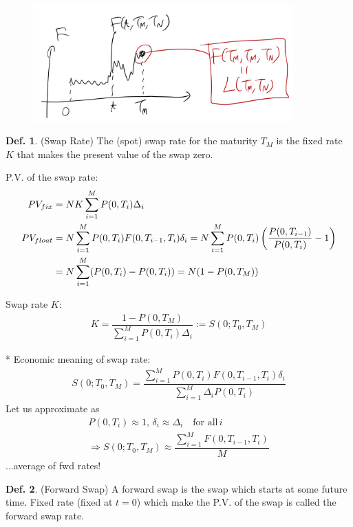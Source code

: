 \documentclass[a4paper,11pt]{jsarticle}
\theoremstyle{definition}
\newtheorem{definition}{Def.}[subsection]
\newcommand{\df}[2]{\dfrac{#1}{#2}}
\begin{document}
\begin{figure}[H]　%
  \begin{center}
    \includegraphics[width=10cm]{fig/1_3_02.JPG}
  \end{center}
\end{figure}


\begin{definition}{(Swap Rate)}
  The (spot) swap rate for the maturity $T_M$ is the fixed rate $K$
  that makes the present value of the swap zero.
\end{definition}

P.V. of the swap rate:
\begin{align}
  PV_{fix}&=NK\sum_{i=1}^M P(0,T_i)\Delta_i \\
  PV_{float}&=N\sum_{i=1}^M P(0,T_i)F(0,T_{i-1},T_i)\delta_i
  =N\sum_{i=1}^M P(0,T_i)
  \left(\df{P(0,T_{i-1})}{P(0,T_i)}-1\right) \notag \\
  &=N\sum_{i=1}^M (P(0,T_i)-P(0,T_i))
  =N(1-P(0,T_M))
\end{align}

Swap rate $K$:
\begin{align}
  K=\df{1-P(0,T_M)}{\sum_{i=1}^M P(0,T_i)\Delta_i}
  :=S(0;T_0,T_M)
\end{align}

* Economic meaning of swap rate:
\begin{align}
  S(0;T_0,T_M)
  =\df{\sum_{i=1}^M P(0,T_i)F(0,T_{i-1},T_i)\delta_i}
  {\sum_{i=1}^M \Delta_i P(0,T_i)}
\end{align}
Let us approximate as
\begin{align}
  P(0,T_i)\approx 1, \, \delta_i\approx\Delta_i
  \quad \mbox{for all} \, i \\
  \Rightarrow
  S(0;T_0,T_M)\approx\df{\sum_{i=1}^M F(0,T_{i-1},T_i)}{M} 
\end{align}
...average of fwd rates!

\begin{definition}{(Forward Swap)}
  A forward swap is the swap which starts at some future time.
  Fixed rate (fixed at $t=0$) which make the P.V. of the swap
  is called the forward swap rate.
\end{definition}
\end{document}
